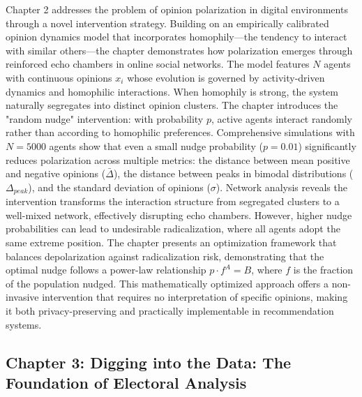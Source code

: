 Chapter 2 addresses the problem of opinion polarization in digital environments through a novel intervention strategy. Building on an empirically calibrated opinion dynamics model that incorporates homophily—the tendency to interact with similar others—the chapter demonstrates how polarization emerges through reinforced echo chambers in online social networks. The model features $N$ agents with continuous opinions $x_i$ whose evolution is governed by activity-driven dynamics and homophilic interactions. When homophily is strong, the system naturally segregates into distinct opinion clusters. The chapter introduces the "random nudge" intervention: with probability $p$, active agents interact randomly rather than according to homophilic preferences. Comprehensive simulations with $N=5000$ agents show that even a small nudge probability ($p=0.01$) significantly reduces polarization across multiple metrics: the distance between mean positive and negative opinions ($\bar{\Delta}$), the distance between peaks in bimodal distributions ($\Delta_{peak}$), and the standard deviation of opinions ($\sigma$). Network analysis reveals the intervention transforms the interaction structure from segregated clusters to a well-mixed network, effectively disrupting echo chambers. However, higher nudge probabilities can lead to undesirable radicalization, where all agents adopt the same extreme position. The chapter presents an optimization framework that balances depolarization against radicalization risk, demonstrating that the optimal nudge follows a power-law relationship $p \cdot f^A = B$, where $f$ is the fraction of the population nudged. This mathematically optimized approach offers a non-invasive intervention that requires no interpretation of specific opinions, making it both privacy-preserving and practically implementable in recommendation systems.

\subsection*{Chapter 3: Digging into the Data: The Foundation of Electoral Analysis}

